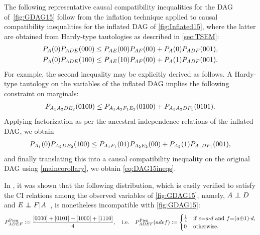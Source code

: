 The following representative causal compatibility inequalities for the DAG of~\cref{fig:GDAG15} follow from the inflation technique applied to causal compatibility inequalities for the inflated DAG of \cref{fig:Inflated15}, where the latter are obtained from Hardy-type tautologies as described in \cref{sec:TSEM}:
\begin{align}
\p[A]{0} \p[A D E]{0 0 0} \leq {\p[A E]{0 0} \p[A F]{0 0}  + \p[A]{0} \p[A D F]{0 0 1}}, \\
\p[A]{0}\p[A D E]{1 0 0} \leq {\p[A E]{1 0} \p[A F]{0 0} + \p[A]{1} \p[A D F]{0 0 1}}.
\label{eq:DAG15ineqs}
\end{align}
For example, the second inequality may be explicitly derived as follows. A Hardy-type tautology on the variables of the inflated DAG implies the following constraint on marginals:
\begin{align}\label{eq:hardyforpienaar}
     \pdf[A_1 A_2 D E_2]{0100} \leq \pdf[A_1 A_2 F_1 E_2]{0100} + \pdf[A_1 A_2 D F_1]{0101} .
\end{align}
Applying factorization as per the ancestral independence relations of the inflated DAG, we obtain 
\begin{align}
 \p[A_1]{0} \p[A_2 D E_2]{100} \leq \p[A_1 F_1]{01} \p[A_2 E_2]{00} + \p[A_2]{1} \p[A_1 D F_1]{001},   
\end{align}
and finally translating this into a causal compatibility inequality on the original DAG using \cref{maincorollary}, we obtain \cref{eq:DAG15ineqs}. 
 
In \citet{pianaar2016interesting}, it was shown that the following distribution, which is easily verified to satisfy the CI relations among the observed variables of \cref{fig:GDAG15}, namely, $A\indep D$ and $E\indep F | A$~\cite{pusey2014gdag}, is nonetheless incompatible with \cref{fig:GDAG15}:
\begin{align}\label{eq:pienaardistro}
P^{\text{Pien}}_{A D E F}:=\frac{[0000]+[0101]+[1000]+[1110]}{4},\quad\text{i.e.}\quad P^{\text{Pien}}_{A D E F}(a d e f):=\begin{cases}\tfrac{1}{4}&\text{if }  e\eql a\cramp{\cdot} d \text{ and } f\eql  (a\cramp{\oplus} 1)\cramp{\cdot} d , \\ 0&\text{otherwise}.\end{cases}
\end{align}

